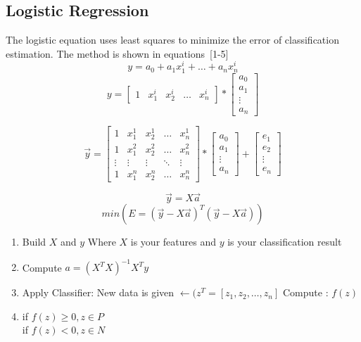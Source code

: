 \documentclass[letterpaper]{article}
\begin{document}
\subsection{Logistic Regression}
The logistic equation uses least squares to minimize the error of classification estimation. The method is shown in equations~[1-5]
\begin{equation}
y = a_0 + a_1 x_1^i + \dots + a_n x_n^i
\end{equation}
\begin{equation}
y = \begin{bmatrix} 1 & x_1^i & x_2^i & \dots & x_n^i \end{bmatrix} * \begin{bmatrix} a_0\\a_1\\ \vdots \\ a_n\end{bmatrix}
\end{equation}

\begin{equation}
\vec{y} = \begin{bmatrix} 1 & x_1^1 & x_2^1 & \dots & x_n^1\\
                     1 & x_1^2 & x_2^2 & \dots & x_n^2\\
                     \vdots & \vdots & \vdots & \ddots & \vdots \\
                     1 & x_1^n & x_2^n & \dots & x_n^n\end{bmatrix} * \begin{bmatrix} a_0 \\ a_1 \\ \vdots \\ a_n\end{bmatrix} + \begin{bmatrix} e_1 \\ e_2 \\ \vdots \\ e_n\end{bmatrix}
\end{equation}

\begin{equation}
\vec{y} = X\vec{a}
\end{equation}
\begin{equation}
min(E = (\vec{y} - X\vec{a})^T(\vec{y} - X\vec{a}))
\end{equation}

\begin{enumerate}
\item Build $X$ and $y$ %
Where $X$ is your features and $y$ is your classification result
\item Compute $a = (X^TX)^{-1}X^Ty$
\item Apply Classifier: New data is given $\leftarrow (z^T = [z_1, z_2, \dots,z_n]$
Compute : $f(z)$
\item if $f(z) \geq 0, z \in P$ \\ if $f(z) < 0, z \in N$
\end{enumerate}
\end{document}
